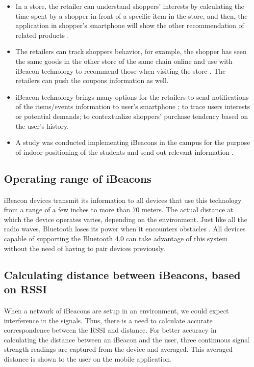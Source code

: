 \documentclass[12pt]{article}
\begin{document}
\begin{itemize}
	\item In a store, the retailer can understand shoppers’ interests by calculating the time spent by a shopper in front of a specific item in the store, and then, the application in shopper’s smartphone will show the other recommendation of related products \cite{beacons}.

\item The retailers can track shoppers behavior, for example, the shopper has seen the same goods in the other store of the same chain online and use with iBeacon technology to recommend those when visiting the store \cite{beacons}. The retailers can push the coupons information as well.

\item iBeacon technology brings many options for the retailers to send notifications of the items/events information to user's smartphone \cite{beacons}; to trace users interests or potential demands; to contextualize shoppers’ purchase tendency based on the user's history.

\item{} A study was conducted implementing iBeacons in the campus for the purpose of indoor positioning of the students and send out relevant information \cite{campus}.

\end{itemize}

\subsection{Operating range of iBeacons}
\paragraph{}iBeacon devices transmit its information to all devices that use this technology from a range of a few inches to more than 70 meters. The actual distance at which the device operates varies, depending on the environment. Just like all the radio waves, Bluetooth loses its power when it encounters obstacles \cite{demo}. All devices capable of supporting the Bluetooth 4.0 can take advantage of this system without the need of having to pair devices previously.

\subsection{Calculating distance between iBeacons, based on RSSI}
\paragraph{}When a network of iBeacons are setup in an environment, we could expect interference in the signals. Thus, there is a need to calculate accurate correspondence between the RSSI and distance. For better accuracy in calculating the distance between an iBeacon and the user, three continuous signal strength readings are captured from the device and averaged. This averaged distance is shown to the user on the mobile application.
\end{document}

